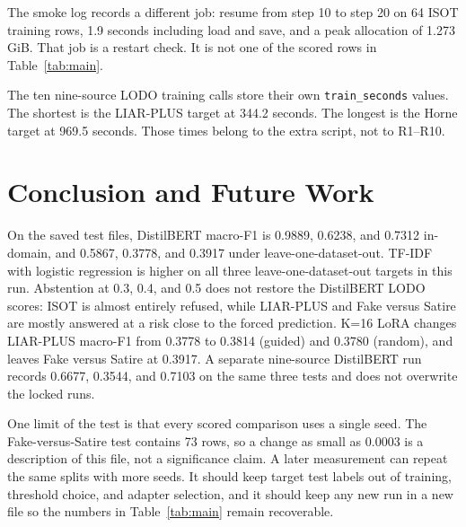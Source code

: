 \documentclass[conference,letterpaper]{IEEEtran}
\begin{document}
The smoke log records a different job: resume from step 10 to step 20 on 64 ISOT training rows, 1.9 seconds including load and save, and a peak allocation of 1.273 GiB. That job is a restart check. It is not one of the scored rows in Table~\ref{tab:main}.

The ten nine-source LODO training calls store their own \texttt{train\_seconds} values. The shortest is the LIAR-PLUS target at 344.2 seconds. The longest is the Horne target at 969.5 seconds. Those times belong to the extra script, not to R1--R10.

\section{Conclusion and Future Work}
On the saved test files, DistilBERT macro-F1 is 0.9889, 0.6238, and 0.7312 in-domain, and 0.5867, 0.3778, and 0.3917 under leave-one-dataset-out. TF-IDF with logistic regression is higher on all three leave-one-dataset-out targets in this run. Abstention at 0.3, 0.4, and 0.5 does not restore the DistilBERT LODO scores: ISOT is almost entirely refused, while LIAR-PLUS and Fake versus Satire are mostly answered at a risk close to the forced prediction. K=16 LoRA changes LIAR-PLUS macro-F1 from 0.3778 to 0.3814 (guided) and 0.3780 (random), and leaves Fake versus Satire at 0.3917. A separate nine-source DistilBERT run records 0.6677, 0.3544, and 0.7103 on the same three tests and does not overwrite the locked runs.

One limit of the test is that every scored comparison uses a single seed. The Fake-versus-Satire test contains 73 rows, so a change as small as 0.0003 is a description of this file, not a significance claim. A later measurement can repeat the same splits with more seeds. It should keep target test labels out of training, threshold choice, and adapter selection, and it should keep any new run in a new file so the numbers in Table~\ref{tab:main} remain recoverable.
\end{document}
